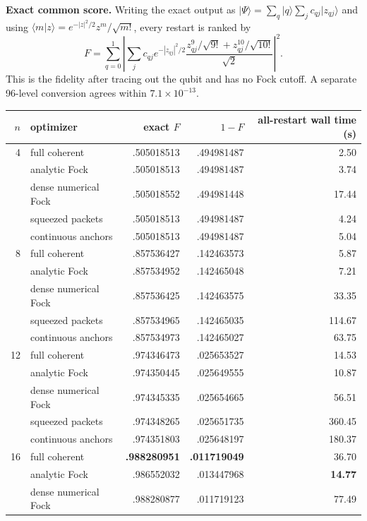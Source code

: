 \documentclass[10pt]{article}
\newcommand{\ket}[1]{\lvert #1\rangle}
\begin{document}
\textbf{Exact common score.}
Writing the exact output as
$\ket\Psi=\sum_q\ket q\sum_jc_{qj}\ket{z_{qj}}$ and using
$\langle m\vert z\rangle=e^{-|z|^2/2}z^m/\sqrt{m!}$, every restart is ranked by
\[
 F=\sum_{q=0}^1\left|\sum_jc_{qj}e^{-|z_{qj}|^2/2}
 \frac{z_{qj}^9/\sqrt{9!}+z_{qj}^{10}/\sqrt{10!}}{\sqrt2}\right|^2 .
\]
This is the fidelity after tracing out the qubit and has no Fock cutoff.
A separate 96-level conversion agrees within $7.1\times10^{-13}$.

\begin{table}[H]
\centering\scriptsize
\setlength{\tabcolsep}{3.5pt}
\begin{tabular}{r l r r r}
\toprule
$n$ & optimizer & exact $F$ & $1-F$ & all-restart wall time (s)\\
\midrule
4 & full coherent & .505018513 & .494981487 & 2.50\\
  & analytic Fock & .505018513 & .494981487 & 3.74\\
  & dense numerical Fock & .505018552 & .494981448 & 17.44\\
  & squeezed packets & .505018513 & .494981487 & 4.24\\
  & continuous anchors & .505018513 & .494981487 & 5.04\\
\midrule
8 & full coherent & .857536427 & .142463573 & 5.87\\
  & analytic Fock & .857534952 & .142465048 & 7.21\\
  & dense numerical Fock & .857536425 & .142463575 & 33.35\\
  & squeezed packets & .857534965 & .142465035 & 114.67\\
  & continuous anchors & .857534973 & .142465027 & 63.75\\
\midrule
12 & full coherent & .974346473 & .025653527 & 14.53\\
   & analytic Fock & .974350445 & .025649555 & 10.87\\
   & dense numerical Fock & .974345335 & .025654665 & 56.51\\
   & squeezed packets & .974348265 & .025651735 & 360.45\\
   & continuous anchors & .974351803 & .025648197 & 180.37\\
\midrule
16 & full coherent & \textbf{.988280951} & \textbf{.011719049} & 36.70\\
   & analytic Fock & .986552032 & .013447968 & \textbf{14.77}\\
   & dense numerical Fock & .988280877 & .011719123 & 77.49\\

\end{tabular}
\end{table}
\end{document}

